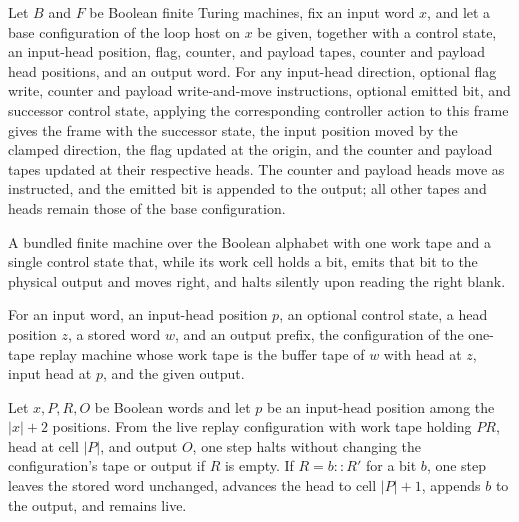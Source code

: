 \begin{lemma}
\label{Turing.FinTM.loopControl_apply}
\leanok
{}
Let $B$ and $F$ be Boolean finite Turing machines, fix an input word $x$, and let a base
configuration of the loop host on $x$ be given, together with a control state, an
input-head position, flag, counter, and payload tapes, counter and payload head
positions, and an output word. For any input-head direction, optional flag write,
counter and payload write-and-move instructions, optional emitted bit, and successor
control state, applying the corresponding controller action to this frame gives the
frame with the successor state, the input position moved by the clamped direction, the
flag updated at the origin, and the counter and payload tapes updated at their
respective heads. The counter and payload heads move as instructed, and the emitted bit
is appended to the output; all other tapes and heads remain those of the base
configuration.
\end{lemma}

\begin{definition}
\label{Turing.FinTM.loopReplayTM}
\leanok
{}
A bundled finite machine over the Boolean alphabet with one work tape and a single
control state that, while its work cell holds a bit, emits that bit to the physical
output and moves right, and halts silently upon reading the right blank.
\end{definition}

\begin{definition}
\label{Turing.FinTM.loopReplayCfg}
\leanok
{}
For an input word, an input-head position $p$, an optional control state, a head
position $z$, a stored word $w$, and an output prefix, the configuration of the one-tape
replay machine whose work tape is the buffer tape of $w$ with head at $z$, input head at
$p$, and the given output.
\end{definition}

\begin{lemma}
\label{Turing.FinTM.loopReplay_step}
\leanok
{}
Let $x,P,R,O$ be Boolean words and let $p$ be an input-head position among the $|x|+2$
positions. From the live replay configuration with work tape holding $PR$, head at cell
$|P|$, and output $O$, one step halts without changing the configuration's tape or
output if $R$ is empty. If $R=b::R'$ for a bit $b$, one step leaves the stored word
unchanged, advances the head to cell $|P|+1$, appends $b$ to the output, and remains
live.
\end{lemma}

